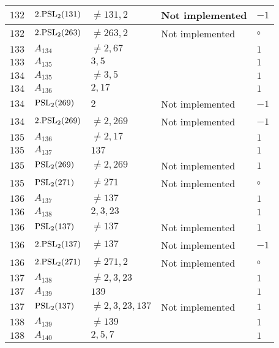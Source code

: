\documentclass[a4paper, 11pt]{article}
\begin{document}
\begin{longtable}{lllll}
        $ 132 $ & $ 2.{\rm PSL}_{2}(131) $ & $ \neq 131, 2 $ & Not implemented & $ -1  $ \\ \hline
        $ 132 $ & $ 2.{\rm PSL}_{2}(263) $ & $ \neq 263, 2 $ & Not implemented & $\circ$ \\ \hline
        $ 133 $ & $ A_{134} $ & $ \neq 2, 67 $ & $ ~ $ & $ 1  $ \\ \hline
        $ 133 $ & $ A_{135} $ & $ 3, 5 $ & $ ~ $ & $ 1  $ \\ \hline
        $ 134 $ & $ A_{135} $ & $ \neq 3, 5 $ & $ ~ $ & $ 1  $ \\ \hline
        $ 134 $ & $ A_{136} $ & $ 2, 17 $ & $ ~ $ & $ 1  $ \\ \hline
        $ 134 $ & $ {\rm PSL}_{2}(269) $ & $ 2 $ & Not implemented & $ -1  $ \\ \hline
        $ 134 $ & $ 2.{\rm PSL}_{2}(269) $ & $ \neq 2, 269 $ & Not implemented & $ -1  $ \\ \hline
        $ 135 $ & $ A_{136} $ & $ \neq 2, 17 $ & $ ~ $ & $ 1  $ \\ \hline
        $ 135 $ & $ A_{137} $ & $ 137 $ & $ ~ $ & $ 1  $ \\ \hline
        $ 135 $ & $ {\rm PSL}_{2}(269) $ & $ \neq 2, 269 $ & Not implemented & $ 1  $ \\ \hline
        $ 135 $ & $ {\rm PSL}_{2}(271) $ & $ \neq 271 $ & Not implemented & $\circ$ \\ \hline
        $ 136 $ & $ A_{137} $ & $ \neq 137 $ & $ ~ $ & $ 1  $ \\ \hline
        $ 136 $ & $ A_{138} $ & $ 2, 3, 23 $ & $ ~ $ & $ 1  $ \\ \hline
        $ 136 $ & $ {\rm PSL}_{2}(137) $ & $ \neq 137 $ & Not implemented & $ 1  $ \\ \hline
        $ 136 $ & $ 2.{\rm PSL}_{2}(137) $ & $ \neq 137 $ & Not implemented & $ -1  $ \\ \hline
        $ 136 $ & $ 2.{\rm PSL}_{2}(271) $ & $ \neq 271, 2 $ & Not implemented & $\circ$ \\ \hline
        $ 137 $ & $ A_{138} $ & $ \neq 2, 3, 23 $ & $ ~ $ & $ 1  $ \\ \hline
        $ 137 $ & $ A_{139} $ & $ 139 $ & $ ~ $ & $ 1  $ \\ \hline
        $ 137 $ & $ {\rm PSL}_{2}(137) $ & $ \neq 2, 3, 23, 137 $ & Not implemented & $ 1  $ \\ \hline
        $ 138 $ & $ A_{139} $ & $ \neq 139 $ & $ ~ $ & $ 1  $ \\ \hline
        $ 138 $ & $ A_{140} $ & $ 2, 5, 7 $ & $ ~ $ & $ 1  $ \\ \hline

\end{longtable}
\end{document}

